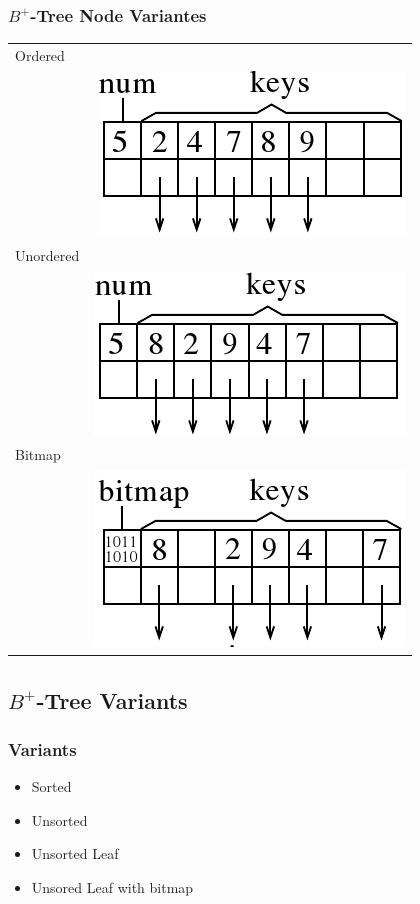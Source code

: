 \begin{frame}
\frametitle{$B^+$-Tree Node Variantes}
\begin{tabular}[t]{l r}
Ordered  & \\
& \includegraphics[scale=0.25]{images/ordered.png} \\
Unordered & \\
& \includegraphics[scale=0.25]{images/unordered.png} \\
Bitmap & \\
&\includegraphics[scale=0.25]{images/bitmap.png}
\end{tabular}


\end{frame}



\subsection{$B^+$-Tree Variants}
\begin{frame}
\frametitle{Variants}

\begin{itemize}
\item Sorted
\item Unsorted
\item Unsorted Leaf
\item Unsored Leaf with bitmap
\end{itemize}

\end{frame}